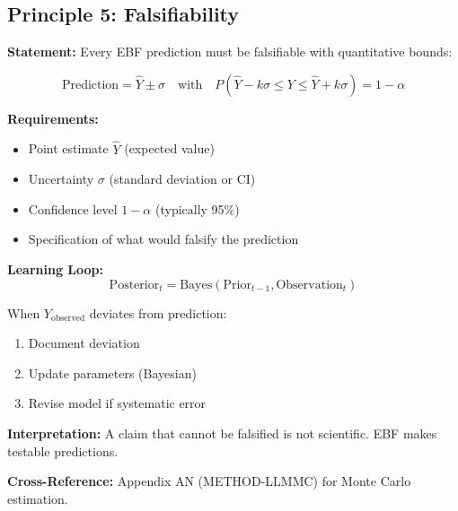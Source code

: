 \subsection{Principle 5: Falsifiability}

\begin{tcolorbox}[colback=gray!5!white, colframe=gray!75!black,
    title=Axiom PR-5: Falsifiable Predictions]

\textbf{Statement:} Every EBF prediction must be falsifiable with quantitative bounds:

\begin{equation}
\text{Prediction} = \hat{Y} \pm \sigma \quad \text{with} \quad P(\hat{Y} - k\sigma \leq Y \leq \hat{Y} + k\sigma) = 1 - \alpha
\end{equation}

\textbf{Requirements:}
\begin{itemize}[nosep]
    \item Point estimate $\hat{Y}$ (expected value)
    \item Uncertainty $\sigma$ (standard deviation or CI)
    \item Confidence level $1 - \alpha$ (typically 95\%)
    \item Specification of what would falsify the prediction
\end{itemize}

\textbf{Learning Loop:}
\begin{equation}
\text{Posterior}_t = \text{Bayes}(\text{Prior}_{t-1}, \text{Observation}_t)
\end{equation}

When $Y_{\text{observed}}$ deviates from prediction:
\begin{enumerate}
    \item Document deviation
    \item Update parameters (Bayesian)
    \item Revise model if systematic error
\end{enumerate}

\textbf{Interpretation:} A claim that cannot be falsified is not scientific. EBF makes testable predictions.

\textbf{Cross-Reference:} Appendix AN (METHOD-LLMMC) for Monte Carlo estimation.

\end{tcolorbox}


